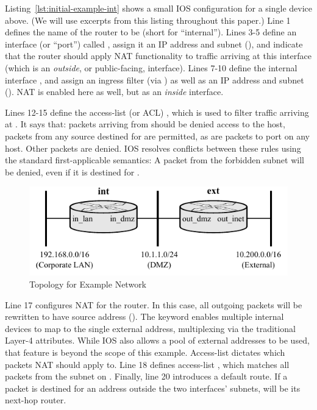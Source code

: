 Listing~\ref{lst:initial-example-int} shows a small IOS configuration for a single
device above. (We will use excerpts from this listing throughout this paper.)
Line 1 defines the name of the router to be  (short for
``internal''). Lines 3-5 define an interface (or ``port'') called ,
assign it an IP address and subnet (), and indicate
that the router should apply NAT functionality to traffic arriving at this interface
(which is an \emph{outside}, or public-facing, interface). Lines 7-10 define the internal
interface , and assign an ingress filter (via ) as
well as an IP address and subnet (). NAT is enabled here
as well, but as an \emph{inside} interface.

Lines 12-15 define the access-list (or ACL) , which is used to filter traffic
arriving at . It says that:  packets arriving from 
should be denied access to the  host, 
packets from any source destined for  are permitted, as are
 packets to port  on any host. Other packets are denied. IOS
resolves conflicts between these rules using the standard first-applicable
semantics: A packet from the forbidden subnet will be denied, even if it is
destined for .

\begin{figure}
  \centering
  \includegraphics[scale=0.95]{figs/orig_network.pdf}
  \caption{Topology for Example Network}
  \label{fig:orig-network}
\end{figure}

Line 17 configures NAT for the router. In this case, all outgoing packets will
be rewritten to have source address  ().
The  keyword enables multiple internal devices to map to the single
external address, multiplexing via the traditional Layer-4 attributes. While IOS also
allows a pool of external addresses to be used, that feature is beyond the
scope of this example. Access-list  dictates which packets NAT should
apply to. Line 18 defines access-list , which matches all packets from
the subnet on . Finally, line 20 introduces a default route.
If a packet is destined for an address outside the two interfaces'
subnets,  will be its next-hop router.

